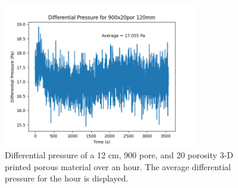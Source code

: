 \begin{figure}[H]
  \begin{center}
    \includegraphics[width=0.75\textwidth]{900_20por_110-120_1hr_(.25-.42speed).png}
  \end{center}
  \caption{Differential pressure of a 12 cm, 900 pore, and 20 porosity 3-D printed porous 
material over an hour. The average differential pressure for the hour is displayed.}
  \label{fig:12cm_dp_graph}
\end{figure}
 
